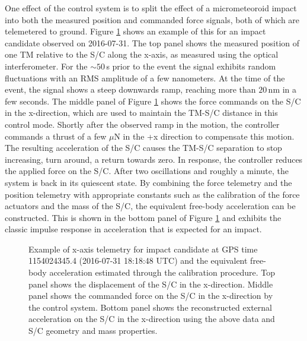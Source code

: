 \documentclass[twocolumn, trackchanges]{aastex62}
\begin{document}
One effect of the control system is to split the effect of a micrometeoroid impact into both the measured position and commanded force signals, both of which are telemetered to ground. Figure \ref{fig:calExample} shows an example of this for an impact candidate observed on 2016-07-31.  The top panel shows the measured position of one TM relative to the S/C along the x-axis, as measured using the optical interferometer.  For the  $\sim50\,$s prior to the event the signal exhibits random fluctuations with an RMS amplitude of a few nanometers. At the time of the event, the signal shows a steep downwards ramp, reaching more than $20\,$nm in a few seconds.  The middle panel of Figure \ref{fig:calExample} shows the force commands on the S/C in the x-direction, which are used to maintain the TM-S/C distance in this control mode. Shortly after the observed ramp in the motion, the controller commands a thrust of a few $\mu$N in the +x direction to compensate this motion.  The resulting acceleration of the S/C causes the TM-S/C separation to stop increasing, turn around, a return towards zero. In response, the controller reduces the applied force on the S/C. After two oscillations and roughly a minute, the system is back in its quiescent state.  By combining the force telemetry and the position telemetry with appropriate constants such as the calibration of the force actuators and the mass of the S/C, the equivalent free-body acceleration can be constructed. This is shown in the bottom panel of Figure \ref{fig:calExample} and exhibits the classic impulse response in acceleration that is expected for an impact. 

\begin{figure}
\vspace*{-10mm}
\caption{Example of x-axis telemetry for impact candidate at GPS time 1154024345.4 (2016-07-31 18:18:48 UTC) and the equivalent free-body acceleration estimated through the calibration procedure. Top panel shows the displacement of the S/C in the x-direction. Middle panel shows the commanded force on the S/C in the x-direction by the control system. Bottom panel shows the reconstructed external acceleration on the S/C in the x-direction using the above data and S/C geometry and mass properties. \label{fig:calExample}}
\end{figure}
\end{document}
